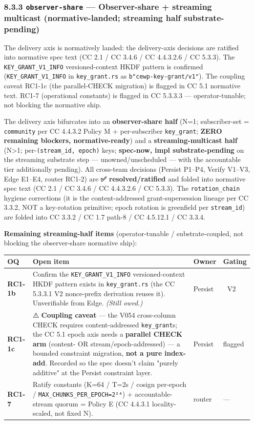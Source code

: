 \documentclass[11pt]{article}
\begin{document}
\subsubsection*{8.3.3 \texttt{observer-share} — Observer-share + streaming multicast (normative-landed; streaming half substrate-pending)}


The delivery axis is normatively landed: the delivery-axis decisions are ratified into normative spec text (CC 2.1 / CC 3.4.6 / CC 4.4.3.2.6 / CC 5.3.3). The \texttt{KEY\_GRANT\_V1\_INFO} versioned-context HKDF pattern is confirmed (\texttt{KEY\_GRANT\_V1\_INFO} in \texttt{key\_grant.rs} as \texttt{b"cewp-key-grant/v1"}). The coupling caveat RC1-1c (the parallel-CHECK migration) is flagged in CC 5.1 normative text. RC1-7 (operational constants) is flagged in CC 5.3.3.3 — operator-tunable; not blocking the normative ship.


The delivery axis bifurcates into an \textbf{observer-share half} (N=1; subscriber-set = \texttt{community} per CC 4.4.3.2 Policy M + per-subscriber \texttt{key\_grant}; \textbf{ZERO remaining blockers, normative-ready}) and a \textbf{streaming-multicast half} (N>1; per-\texttt{(stream\_id, epoch)} keys; \textbf{spec-now, impl substrate-pending} on the streaming substrate step — unowned/unscheduled — with the accountable tier additionally pending). All cross-team decisions (Persist P1–P4, Verify V1–V3, Edge E1–E4, router RC1-2) are \textbf{✅ resolved/ratified} and folded into normative spec text (CC 2.1 / CC 3.4.6 / CC 4.4.3.2.6 / CC 5.3.3). The \texttt{rotation\_chain} hygiene corrections (it is the content-addressed grant-supersession lineage per CC 3.3.2, NOT a key-rotation primitive; epoch rotation is greenfield per \texttt{stream\_id}) are folded into CC 3.3.2 / CC 1.7 path-8 / CC 4.5.12.1 / CC 3.3.4.


\textbf{Remaining streaming-half items} (operator-tunable / substrate-coupled, not blocking the observer-share normative ship):


{\scriptsize
\begin{longtable}{|p{4.0cm}|p{4.0cm}|p{4.0cm}|p{4.0cm}|}\hline
\textbf{OQ} & \textbf{Open item} & \textbf{Owner} & \textbf{Gating} \\ \hline\endhead
\textbf{RC1-1b} & Confirm the \texttt{KEY\_GRANT\_V1\_INFO} versioned-context HKDF pattern exists in \texttt{key\_grant.rs} (the CC 5.3.3.1 V2 nonce-prefix derivation reuses it). Unverifiable from Edge. \textit{(Still owed.)} & Persist & 🔴 V2 \\ \hline
\textbf{RC1-1c} & ⚠️ \textbf{Coupling caveat} — the V054 cross-column CHECK requires content-addressed \texttt{key\_grant}s; the CC 5.1 epoch axis needs a \textbf{parallel CHECK arm} (content- OR stream/epoch-addressed) — a bounded constraint migration, \textbf{not a pure index-add}. Recorded so the spec doesn't claim "purely additive" at the Persist constraint layer. & Persist & flagged \\ \hline
\textbf{RC1-7} & Ratify constants (K=64 / T=2s / cosign per-epoch / \texttt{MAX\_CHUNKS\_PER\_EPOCH=2²⁴}) + accountable-stream quorum = Policy E (CC 4.4.3.1 locality-scaled, not fixed N). & router & — \\ \hline
\end{longtable}}
\end{document}
